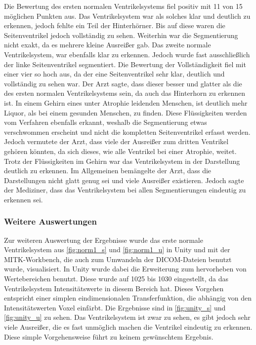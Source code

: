 Die Bewertung des ersten normalen Ventrikelsystems fiel positiv mit 11 von 15 möglichen Punkten aus. Das Ventrikelsystem war als solches klar und deutlich zu erkennen, jedoch fehlte ein Teil der Hinterhörner. Bis auf diese waren die Seitenventrikel jedoch vollständig zu sehen. Weiterhin war die Segmentierung nicht exakt, da es mehrere kleine Ausreißer gab.
\newline
Das zweite normale Ventrikelsystem, war ebenfalls klar zu erkennen. Jedoch wurde fast ausschließlich der linke Seitenventrikel segmentiert. Die Bewertung der Vollständigkeit fiel mit einer vier so hoch aus, da der eine Seitenventrikel sehr klar, deutlich und vollständig zu sehen war. Der Arzt sagte, dass dieser besser und glatter als die des ersten normalen Ventrikelsystems sein, da auch das Hinterhorn zu erkennen ist. 
\newline
In einem Gehirn eines unter Atrophie leidenden Menschen, ist deutlich mehr Liquor, als bei einem gesunden Menschen, zu finden. Diese Flüssigkeiten werden vom Verfahren ebenfalls erkannt, weshalb die Segmentierung etwas verschwommen erscheint und nicht die kompletten Seitenventrikel erfasst werden. Jedoch vermutete der Arzt, dass viele der Ausreißer zum dritten Ventrikel gehören könnten, da sich dieses, wie alle Ventrikel bei einer Atrophie, weitet. Trotz der Flüssigkeiten im Gehirn war das Ventrikelsystem in der Darstellung deutlich zu erkennen.
\newline
Im Allgemeinen bemängelte der Arzt, dass die Darstellungen nicht glatt genug sei und viele Ausreißer existieren. Jedoch sagte der Mediziner, dass das Ventrikelsystem bei allen Segmentierungen eindeutig zu erkennen sei.

\subsubsection{Weitere Auswertungen}

Zur weiteren Auswertung der Ergebnisse wurde das erste normale Ventrikelsystem aus \autoref{fig:norm1_s} und \autoref{fig:norm1_u} in Unity und mit der MITK-Workbench, die auch zum Umwandeln der DICOM-Dateien benutzt wurde, visualisiert.
\newline
In Unity wurde dabei die Erweiterung zum hervorheben von Wertebereichen benutzt. Diese wurde auf 1025 bis 1030 eingestellt, da das Ventrikelsystem Intensitätswerte in diesem Bereich hat. Dieses Vorgehen entspricht einer simplen eindimensionalen Transferfunktion, die abhängig von den Intensitätswerten Voxel einfärbt.
\newline
Die Ergebnisse sind in \autoref{fig:unity_s} und \autoref{fig:unity_u} zu sehen. Das Ventrikelsystem ist zwar zu sehen, es gibt jedoch sehr viele Ausreißer, die es fast unmöglich machen die Ventrikel eindeutig zu erkennen. Diese simple Vorgehensweise führt zu keinem gewünschtem Ergebnis.


